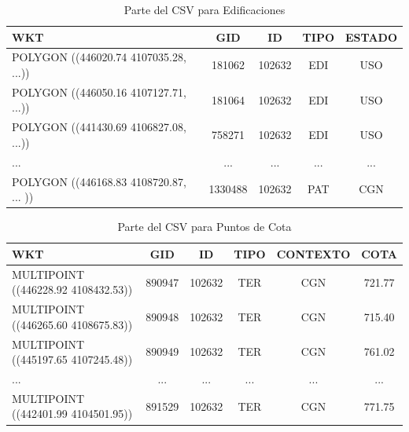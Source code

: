 \begin{table}[H]
	\centering
	\caption{Parte del CSV para Edificaciones}
	\label{csv-poligonos}
	\begin{tabular}{|m{4cm}|c|c|c|c|}
		\hline
		\rowcolor[HTML]{EFEFEF} 
		\textbf{WKT}                        & \textbf{GID} & \textbf{ID} & \textbf{TIPO} & \textbf{ESTADO} \\ \hline
		POLYGON ((446020.74 4107035.28, ...)) & 181062       & 102632            & EDI           & USO                       \\ \hline
		POLYGON ((446050.16 4107127.71, ...))  & 181064       & 102632            & EDI           & USO                  \\ \hline
		POLYGON ((441430.69 4106827.08, ...)) & 758271       & 102632            & EDI           & USO                     \\ \hline
		...  & ...       & ...            & ...           & ...                     \\ \hline
		POLYGON ((446168.83 4108720.87, ... )) & 1330488       & 102632            & PAT           & CGN                    \\ \hline
	\end{tabular}
\end{table}

\begin{table}[H]
	\centering
	\caption{Parte del CSV para Puntos de Cota}
	\label{csv-puntos}
	\begin{tabular}{|m{3cm}|c|c|c|c|c|}
		\hline
		\rowcolor[HTML]{EFEFEF} 
		\textbf{WKT}                        & \textbf{GID} & \textbf{ID} & \textbf{TIPO} & \textbf{CONTEXTO} & \textbf{COTA} \\ \hline
		MULTIPOINT ((446228.92 4108432.53)) & 890947       & 102632            & TER           & CGN               & 721.77        \\ \hline
		MULTIPOINT ((446265.60 4108675.83))  & 890948       & 102632            & TER           & CGN               & 715.40        \\ \hline
		MULTIPOINT ((445197.65 4107245.48)) & 890949       & 102632            & TER           & CGN               & 761.02        \\ \hline
		...  & ...       & ...            & ...           & ...               &...        \\ \hline
		MULTIPOINT ((442401.99 4104501.95)) & 891529       & 102632            & TER           & CGN               & 771.75        \\ \hline
	\end{tabular}
\end{table}




